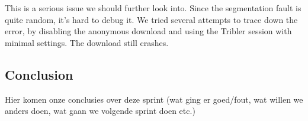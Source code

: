 	This is a serious issue we should further look into. Since the segmentation fault is quite random, it's hard to debug it. We tried several attempts to trace down the error, by disabling the anonymous download and using the Tribler session with minimal settings. The download still crashes.
	
	\subsection{Conclusion}
		Hier komen onze conclusies over deze sprint (wat ging er goed/fout, wat willen we anders doen, wat gaan we volgende sprint doen etc.)
